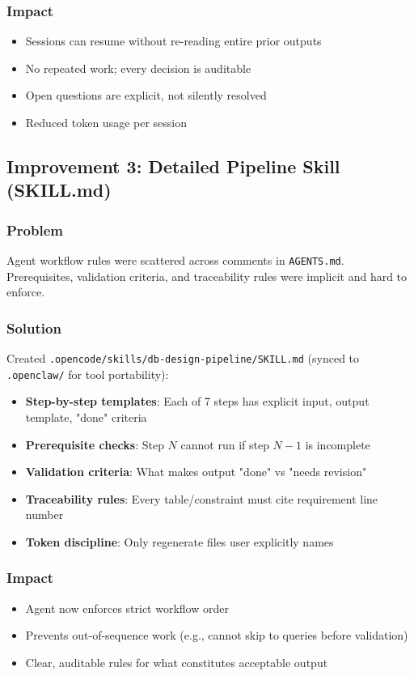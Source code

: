 \documentclass[12pt,a4paper]{article}
\begin{document}
\subsubsection{Impact}
\begin{itemize}
    \item Sessions can resume without re-reading entire prior outputs
    \item No repeated work; every decision is auditable
    \item Open questions are explicit, not silently resolved
    \item Reduced token usage per session
\end{itemize}

\subsection{Improvement 3: Detailed Pipeline Skill (SKILL.md)}

\subsubsection{Problem}
Agent workflow rules were scattered across comments in \texttt{AGENTS.md}. Prerequisites, validation criteria, and traceability rules were implicit and hard to enforce.

\subsubsection{Solution}
Created \texttt{.opencode/skills/db-design-pipeline/SKILL.md} (synced to \texttt{.openclaw/} for tool portability):

\begin{itemize}
    \item \textbf{Step-by-step templates}: Each of 7 steps has explicit input, output template, "done" criteria
    \item \textbf{Prerequisite checks}: Step $N$ cannot run if step $N-1$ is incomplete
    \item \textbf{Validation criteria}: What makes output "done" vs "needs revision"
    \item \textbf{Traceability rules}: Every table/constraint must cite requirement line number
    \item \textbf{Token discipline}: Only regenerate files user explicitly names
\end{itemize}

\subsubsection{Impact}
\begin{itemize}
    \item Agent now enforces strict workflow order
    \item Prevents out-of-sequence work (e.g., cannot skip to queries before validation)
    \item Clear, auditable rules for what constitutes acceptable output
\end{itemize}
\end{document}

